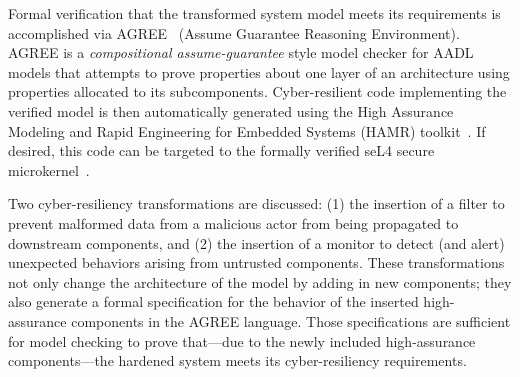 Formal
verification that the transformed system model meets its requirements
is accomplished via AGREE~\cite{agree2013} (Assume Guarantee Reasoning
Environment).
AGREE is a {\em compositional assume-guarantee} style model checker
for AADL models that attempts to prove properties about one layer of
an architecture using properties allocated to its subcomponents.
Cyber-resilient code implementing the verified model is then
automatically generated using the High Assurance Modeling and Rapid
Engineering for Embedded Systems (HAMR) toolkit~\cite{hamr}.  If
desired, this code can be targeted to the formally verified seL4
secure microkernel~\cite{sel4-2009}.


Two cyber-resiliency transformations are discussed: (1) the insertion
of a filter to prevent malformed data from a malicious actor from
being propagated to downstream components, and (2) the insertion of a
monitor to detect (and alert) unexpected behaviors arising from
untrusted components. These transformations not only change the
architecture of the model by adding in new components; they also
generate a formal specification for the behavior of the inserted
high-assurance components in the AGREE language. Those specifications
are sufficient for model checking to prove that---due to the newly
included high-assurance components---the hardened system meets its
cyber-resiliency requirements.


